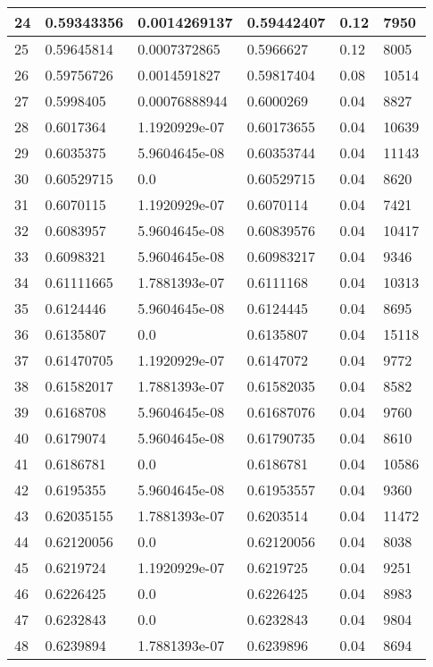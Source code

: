 \begin{longtable}{|l|l|l|l|l|l|}
24 & 0.59343356 & 0.0014269137 & 0.59442407 & 0.12 & 7950 \\ \hline 
25 & 0.59645814 & 0.0007372865 & 0.5966627 & 0.12 & 8005 \\ \hline 
26 & 0.59756726 & 0.0014591827 & 0.59817404 & 0.08 & 10514 \\ \hline 
27 & 0.5998405 & 0.00076888944 & 0.6000269 & 0.04 & 8827 \\ \hline 
28 & 0.6017364 & 1.1920929e-07 & 0.60173655 & 0.04 & 10639 \\ \hline 
29 & 0.6035375 & 5.9604645e-08 & 0.60353744 & 0.04 & 11143 \\ \hline 
30 & 0.60529715 & 0.0 & 0.60529715 & 0.04 & 8620 \\ \hline 
31 & 0.6070115 & 1.1920929e-07 & 0.6070114 & 0.04 & 7421 \\ \hline 
32 & 0.6083957 & 5.9604645e-08 & 0.60839576 & 0.04 & 10417 \\ \hline 
33 & 0.6098321 & 5.9604645e-08 & 0.60983217 & 0.04 & 9346 \\ \hline 
34 & 0.61111665 & 1.7881393e-07 & 0.6111168 & 0.04 & 10313 \\ \hline 
35 & 0.6124446 & 5.9604645e-08 & 0.6124445 & 0.04 & 8695 \\ \hline 
36 & 0.6135807 & 0.0 & 0.6135807 & 0.04 & 15118 \\ \hline 
37 & 0.61470705 & 1.1920929e-07 & 0.6147072 & 0.04 & 9772 \\ \hline 
38 & 0.61582017 & 1.7881393e-07 & 0.61582035 & 0.04 & 8582 \\ \hline 
39 & 0.6168708 & 5.9604645e-08 & 0.61687076 & 0.04 & 9760 \\ \hline 
40 & 0.6179074 & 5.9604645e-08 & 0.61790735 & 0.04 & 8610 \\ \hline 
41 & 0.6186781 & 0.0 & 0.6186781 & 0.04 & 10586 \\ \hline 
42 & 0.6195355 & 5.9604645e-08 & 0.61953557 & 0.04 & 9360 \\ \hline 
43 & 0.62035155 & 1.7881393e-07 & 0.6203514 & 0.04 & 11472 \\ \hline 
44 & 0.62120056 & 0.0 & 0.62120056 & 0.04 & 8038 \\ \hline 
45 & 0.6219724 & 1.1920929e-07 & 0.6219725 & 0.04 & 9251 \\ \hline 
46 & 0.6226425 & 0.0 & 0.6226425 & 0.04 & 8983 \\ \hline 
47 & 0.6232843 & 0.0 & 0.6232843 & 0.04 & 9804 \\ \hline 
48 & 0.6239894 & 1.7881393e-07 & 0.6239896 & 0.04 & 8694 \\ \hline 

\end{longtable}
